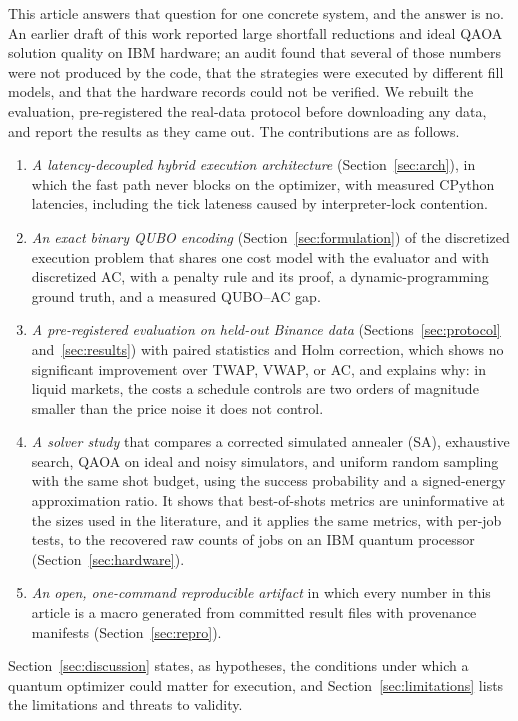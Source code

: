 \documentclass[journal]{IEEEtran}
\begin{document}
This article answers that question for one concrete system, and the answer is no. An
earlier draft of this work reported large shortfall reductions and ideal QAOA solution
quality on IBM hardware; an audit found that several of those numbers were not produced by
the code, that the strategies were executed by different fill models, and that the hardware
records could not be verified. We rebuilt the evaluation, pre-registered the real-data
protocol before downloading any data, and report the results as they came out. The
contributions are as follows.
\begin{enumerate}
\item \emph{A latency-decoupled hybrid execution architecture} (Section~\ref{sec:arch}), in
  which the fast path never blocks on the optimizer, with measured CPython latencies,
  including the tick lateness caused by interpreter-lock contention.
\item \emph{An exact binary QUBO encoding} (Section~\ref{sec:formulation}) of the
  discretized execution problem that shares one cost model with the evaluator and with
  discretized AC, with a penalty rule and its proof, a dynamic-programming ground truth, and
  a measured QUBO--AC gap.
\item \emph{A pre-registered evaluation on held-out Binance data}
  (Sections~\ref{sec:protocol} and~\ref{sec:results}) with paired statistics and Holm
  correction, which shows no significant improvement over TWAP, VWAP, or AC, and explains
  why: in liquid markets, the costs a schedule controls are two orders of magnitude smaller
  than the price noise it does not control.
\item \emph{A solver study} that compares a corrected simulated annealer (SA), exhaustive
  search, QAOA on ideal and noisy simulators, and uniform random sampling with the same shot
  budget, using the success probability and a signed-energy approximation ratio. It shows
  that best-of-shots metrics are uninformative at the sizes used in the literature, and it
  applies the same metrics, with per-job tests, to the recovered raw counts of \HwNumJobs{}
  jobs on an IBM quantum processor (Section~\ref{sec:hardware}).
\item \emph{An open, one-command reproducible artifact} in which every number in this
  article is a macro generated from committed result files with provenance manifests
  (Section~\ref{sec:repro}).
\end{enumerate}
Section~\ref{sec:discussion} states, as hypotheses, the conditions under which a quantum
optimizer could matter for execution, and Section~\ref{sec:limitations} lists the
limitations and threats to validity.
\end{document}
